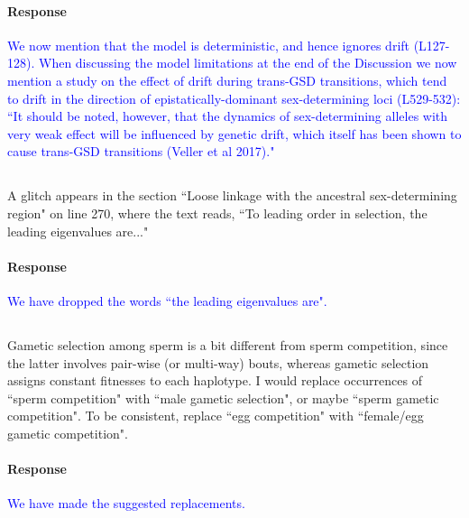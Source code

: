 \documentclass[10pt,letterpaper]{article}
\begin{document}
\noindent\paragraph{Response}
\textcolor{blue}{
We now mention that the model is deterministic, and hence ignores drift (L127-128). 
When discussing the model limitations at the end of the Discussion we now mention a study on the effect of drift during trans-GSD transitions, which tend to drift in the direction of epistatically-dominant sex-determining loci (L529-532): ``It should be noted, however, that the dynamics of sex-determining alleles with very weak effect will be influenced by genetic drift, which itself has been shown to cause trans-GSD transitions (Veller et al 2017)."}

\noindent\subsection{}
A glitch appears in the section ``Loose linkage with the ancestral sex-determining region" on line 270, where the text reads, ``To leading order in selection, the leading eigenvalues are..."

\noindent\paragraph{Response}
\textcolor{blue}{We have dropped the words ``the leading eigenvalues are".}

\noindent\subsection{}
Gametic selection among sperm is a bit different from sperm competition, since the latter involves pair-wise (or multi-way) bouts, whereas gametic selection assigns constant fitnesses to each haplotype. I would replace occurrences of ``sperm competition" with ``male gametic selection", or maybe ``sperm gametic competition". To be consistent, replace ``egg competition" with ``female/egg gametic competition". 

\noindent\paragraph{Response}
\textcolor{blue}{We have made the suggested replacements.
}
\end{document}
